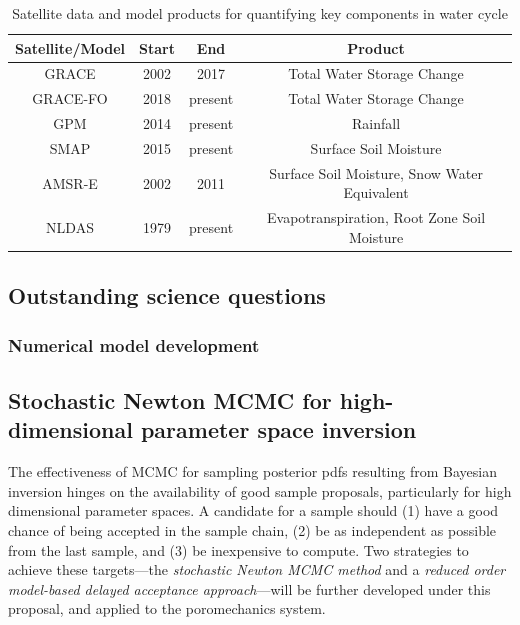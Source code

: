 \documentclass[11pt,final]{article}%
\begin{document}
\begin{table}
\caption{Satellite data and model products for quantifying key components in water cycle}
\centering
\begin{tabular}{c c c c }
\hline\hline
Satellite/Model & Start & End  & Product \\[0.5ex]
\hline
GRACE & 2002 & 2017 & Total Water Storage Change \\
GRACE-FO & 2018 & present & Total Water Storage Change \\
GPM & 2014 & present & Rainfall \\
SMAP & 2015& present & Surface Soil Moisture \\
AMSR-E & 2002 & 2011 & Surface Soil Moisture, Snow Water Equivalent \\
NLDAS & 1979 & present & Evapotranspiration, Root Zone Soil Moisture \\[1.0 ex]
\hline
\end{tabular}
\label{tb:data}
\end{table}

\subsection{Outstanding science questions}



\subsubsection{Numerical model development}\label{sec:num_darcy}

\subsection{Stochastic Newton MCMC for high-dimensional parameter
  space inversion} 
\label{sec:mcmc}


The effectiveness of MCMC for sampling posterior pdfs
resulting from Bayesian inversion hinges on the
availability of good sample proposals, particularly for high
dimensional parameter spaces. A candidate for a sample should (1) have
a good chance of being accepted in the sample chain, (2) be as
independent as possible from the last sample,
and (3) be inexpensive to compute. Two strategies to achieve these
targets---the {\em stochastic Newton MCMC method} and a {\em reduced
  order model-based delayed acceptance approach}---will be further
developed under this proposal, and applied to the poromechanics
system.
\end{document}
